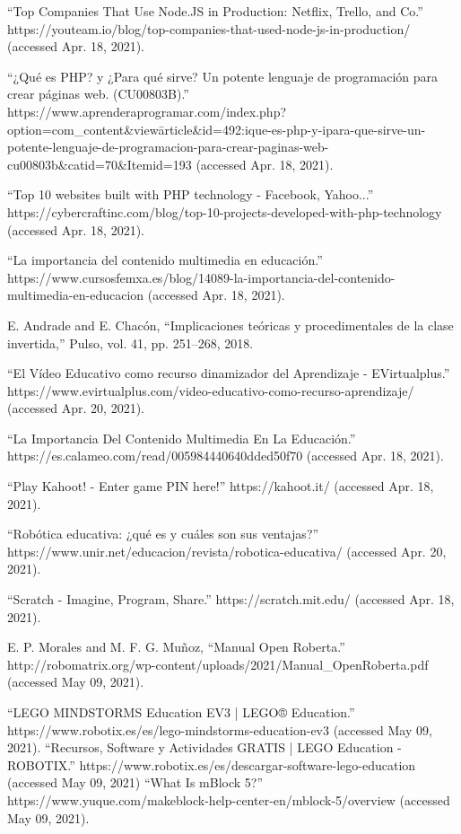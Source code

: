 \begin{thebibliography}{69}
	“Top Companies That Use Node.JS in Production: Netflix, Trello, and Co.” https://youteam.io/blog/top-companies-that-used-node-js-in-production/ (accessed Apr. 18, 2021).


	“¿Qué es PHP? y ¿Para qué sirve? Un potente lenguaje de programación para crear páginas web. (CU00803B).” https://www.aprenderaprogramar.com/index.php?option=com\_content\&view\=article\&id=492:ique-es-php-y-ipara-que-sirve-un-potente-lenguaje-de-programacion-para-crear-paginas-web-cu00803b\&catid=70\&Itemid=193 (accessed Apr. 18, 2021).
  
	“Top 10 websites built with PHP technology - Facebook, Yahoo...” https://cybercraftinc.com/blog/top-10-projects-developed-with-php-technology (accessed Apr. 18, 2021).


	“La importancia del contenido multimedia en educación.” https://www.cursosfemxa.es/blog/14089-la-importancia-del-contenido-multimedia-en-educacion (accessed Apr. 18, 2021).


 E. Andrade and E. Chacón, “Implicaciones teóricas y procedimentales de la clase invertida,” Pulso, vol. 41, pp. 251–268, 2018.

“El Vídeo Educativo como recurso dinamizador del Aprendizaje - EVirtualplus.” https://www.evirtualplus.com/video-educativo-como-recurso-aprendizaje/ (accessed Apr. 20, 2021).

	“La Importancia Del Contenido Multimedia En La Educación.” https://es.calameo.com/read/005984440640dded50f70 (accessed Apr. 18, 2021).

	“Play Kahoot! - Enter game PIN here!” https://kahoot.it/ (accessed Apr. 18, 2021).

“Robótica educativa: ¿qué es y cuáles son sus ventajas?” https://www.unir.net/educacion/revista/robotica-educativa/ (accessed Apr. 20, 2021).

“Scratch - Imagine, Program, Share.” https://scratch.mit.edu/ (accessed Apr. 18, 2021).

 	E. P. Morales and M. F. G. Muñoz, “Manual Open Roberta.” http://robomatrix.org/wp-content/uploads/2021/Manual\_OpenRoberta.pdf (accessed May 09, 2021).

 “LEGO MINDSTORMS Education EV3 | LEGO® Education.” https://www.robotix.es/es/lego-mindstorms-education-ev3 (accessed May 09, 2021).
	“Recursos, Software y Actividades GRATIS | LEGO Education - ROBOTIX.” https://www.robotix.es/es/descargar-software-lego-education (accessed May 09, 2021)
 “What Is mBlock 5?” https://www.yuque.com/makeblock-help-center-en/mblock-5/overview (accessed May 09, 2021).



\end{thebibliography}
